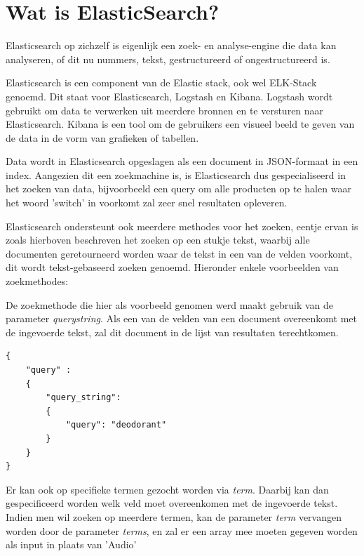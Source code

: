 \section{Wat is ElasticSearch?}
\label{sec:wat is ElasticSearch?}

Elasticsearch op zichzelf is eigenlijk een zoek- en analyse-engine die data kan analyseren, of dit nu nummers, tekst, gestructureerd of ongestructureerd is. 

Elasticsearch is een component van de Elastic stack, ook wel ELK-Stack genoemd. Dit staat voor Elasticsearch, Logstash en Kibana. Logstash wordt gebruikt om data te verwerken uit meerdere bronnen en te versturen naar Elasticsearch. Kibana is een tool om de gebruikers een visueel beeld te geven van de data in de vorm van grafieken of tabellen.

Data wordt in Elasticsearch opgeslagen als een document in JSON-formaat in een index. Aangezien dit een zoekmachine is, is Elasticsearch dus gespecialiseerd in het zoeken van data, bijvoorbeeld een query om alle producten op te halen waar het woord 'switch' in voorkomt zal zeer snel resultaten opleveren.  

\newpage
Elasticsearch ondersteunt ook meerdere methodes voor het zoeken, eentje ervan is zoals hierboven beschreven het zoeken op een stukje tekst, waarbij alle documenten geretourneerd worden waar de tekst in een van de velden voorkomt, dit wordt tekst-gebaseerd zoeken genoemd.  Hieronder enkele voorbeelden van zoekmethodes:  

De zoekmethode die hier als voorbeeld genomen werd maakt gebruik van de parameter \textit{query\textunderscore string}. Als een van de velden van een document overeenkomt met de ingevoerde tekst, zal dit document in de lijst van resultaten terechtkomen.

\begin{lstlisting}[caption={Tekst-gebaseerd zoeken: Query om een simpele zoekopdracht uit te voeren met de term 'deodorant'}]
{
	"query" : 
	{
		"query_string": 
		{
			"query": "deodorant"
		}
	}
}
\end{lstlisting}

Er kan ook op specifieke termen gezocht worden via \textit{term}. Daarbij kan dan gespecificeerd worden welk veld moet overeenkomen met de ingevoerde tekst. 
Indien men wil zoeken op meerdere termen, kan de parameter \textit{term} vervangen worden door de parameter \textit{terms}, en zal er een array mee moeten gegeven worden als input in plaats van 'Audio' 


